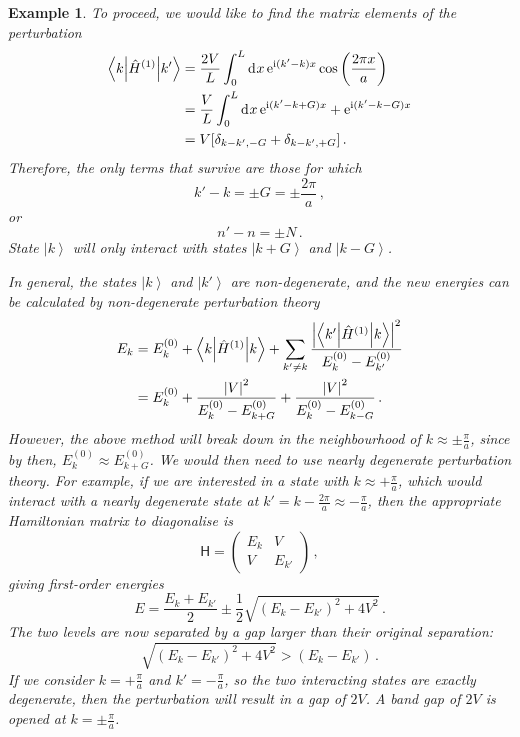 \documentclass{article}
\theoremstyle{plain}\theoremheaderfont{\normalfont\itshape}\theorembodyfont{\rmfamily}\theoremseparator{.}\newtheorem*{rem}{Remark}\newtheorem*{ex}{Example}\newtheorem*{proof}{Proof}\newtheorem*{altp}{Alternative proof}
\theoremstyle{plain}\theoremheaderfont{\normalfont\bfseries}\theorembodyfont{\rmfamily}\theoremseparator{.}\newtheorem{thm}{Theorem}[section]\newtheorem{lem}[thm]{Lemma}\newtheorem{prop}[thm]{Proposition}\newtheorem*{cor}{Corollary}\newtheorem{defn}[thm]{Definition}\newtheorem{clm}[thm]{Claim}\newtheorem{clminproof}{Claim}
\theoremstyle{break}\theoremheaderfont{\normalfont\itshape}\theorembodyfont{\rmfamily}\theoremseparator{.\medskip}\newtheorem*{proofskip}{Proof}\newtheorem*{exs}{Examples}\newtheorem*{rems}{Remarks}
\theoremstyle{break}\theoremheaderfont{\normalfont\bfseries}\theorembodyfont{\rmfamily}\theoremseparator{.\medskip}\newtheorem{lemskip}[thm]{Lemma}\newtheorem{defnskip}[thm]{Definition}\newtheorem{propskip}[thm]{Proposition}\newtheorem{thmskip}[thm]{Theorem}
\numberwithin{equation}{section}
\newcommand{\ii}{\mathrm{i}}
\newcommand{\ee}{\mathrm{e}}
\newcommand{\dd}[2][]{\mathrm{d}^{#1} #2\,}
\newcommand{\ket}[1]{\left| #1 \right\rangle}
\newcommand{\mel}[3]{\left\langle #1 \middle| #2 \middle| #3 \right\rangle}
\newcommand{\expval}[2]{\left\langle #2 \middle| #1 \middle| #2 \right\rangle}
\newcommand{\abs}[1]{\left| #1 \right|}
\begin{document}
\begin{ex}
        To proceed, we would like to find the matrix elements of the perturbation
        \begin{align}
            \mel{k}{\hat{H}^{(1)}}{k'}&=\frac{2V}{L}\int_{0}^{L}\dd{x}\ee^{\ii(k'-k)x}\cos\left(\frac{2\pi x}{a}\right)\notag \\
            &=\frac{V}{L}\int_0^L\dd{x}\ee^{\ii(k'-k+G)x}+\ee^{\ii(k'-k-G)x}\notag\\
            &=V[\delta_{k-k',-G}+\delta_{k-k',+G}]\,.
        \end{align}
        Therefore, the only terms that survive are those for which
        \begin{equation}
            k'-k=\pm G=\pm\frac{2\pi}{a}\,,
        \end{equation}
        or
        \begin{equation}
            n'-n=\pm N\,.
        \end{equation}
        State \(\ket{k}\) will only interact with states \(\ket{k+G}\) and \(\ket{k-G}\).

        In general, the states \(\ket{k}\) and \(\ket{k'}\) are non-degenerate, and the new energies can be calculated by non-degenerate perturbation theory
        \begin{align}
            E_k&=E_k^{(0)}+\expval{\hat{H}^{(1)}}{k}+\sum_{k'\ne k}\frac{\abs{\mel{k'}{\hat{H}^{(1)}}{k}}^2}{E_k^{(0)}-E_{k'}^{(0)}}\notag\\
            &=E_k^{(0)}+\frac{\abs{V}^2}{E_k^{(0)}-E_{k+G}^{(0)}}+\frac{\abs{V}^2}{E_k^{(0)}-E_{k-G}^{(0)}}\,.
        \end{align}
        However, the above method will break down in the neighbourhood of \(k\approx\pm\frac{\pi}{a}\), since by then, \(E_k^{(0)}\approx E_{k+G}^{(0)}\). We would then need to use nearly degenerate perturbation theory. For example, if we are interested in a state with \(k\approx +\frac{\pi}{a}\), which would interact with a nearly degenerate state at \(k'=k-\frac{2\pi}{a}\approx -\frac{\pi}{a}\), then the appropriate Hamiltonian matrix to diagonalise is
        \begin{equation}
            \mathsf{H}=\begin{pmatrix}
                E_k & V \\
                V & E_{k'}
            \end{pmatrix}\,,
        \end{equation}
        giving first-order energies
        \begin{equation}
            E=\frac{E_k+E_{k'}}{2}\pm\frac{1}{2}\sqrt{(E_k-E_{k'})^2+4V^2}\,.
        \end{equation}
        The two levels are now separated by a gap larger than their original separation:
        \begin{equation}
            \sqrt{(E_k-E_{k'})^2+4V^2}>(E_k-E_{k'})\,.
        \end{equation}
        If we consider \(k=+\frac{\pi}{a}\) and \(k'=-\frac{\pi}{a}\), so the two interacting states are exactly degenerate, then the perturbation will result in a gap of \(2V\). A band gap of \(2V\) is opened at \(k=\pm \frac{\pi}{a}\).


\end{ex}
\end{document}
